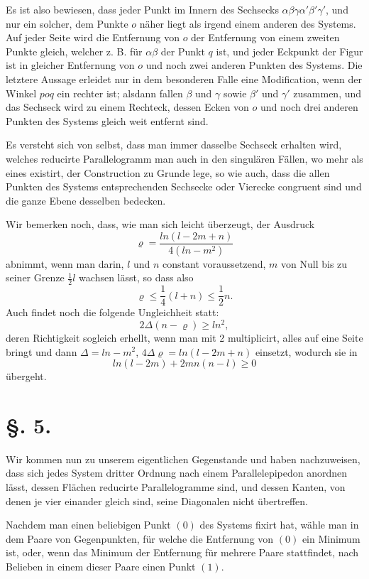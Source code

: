 \documentclass[11pt]{article}
\begin{document}
Es ist also bewiesen, dass jeder Punkt im Innern des Sechsecks $\alpha\beta\gamma\alpha'\beta'\gamma'$, und nur ein solcher, dem Punkte $o$ näher liegt als irgend einem anderen des Systems. Auf jeder Seite wird die Entfernung von $o$ der Entfernung von einem zweiten Punkte gleich, welcher z. B. für $\alpha\beta$ der Punkt $q$ ist, und jeder Eckpunkt der Figur ist in gleicher Entfernung von $o$ und noch zwei anderen Punkten des Systems. Die letztere Aussage erleidet nur in dem besonderen Falle eine Modification, wenn der Winkel $poq$ ein rechter ist; alsdann fallen $\beta$ und $\gamma$ sowie $\beta'$ und $\gamma'$ zusammen, und das Sechseck wird zu einem Rechteck, dessen Ecken von $o$ und noch drei anderen Punkten des Systems gleich weit entfernt sind.

Es versteht sich von selbst, dass man immer dasselbe Sechseck erhalten wird, welches reducirte Parallelogramm man auch in den singulären Fällen, wo mehr als eines existirt, der Construction zu Grunde lege, so wie auch, dass die allen Punkten des Systems entsprechenden Sechsecke oder Vierecke congruent sind und die ganze Ebene desselben bedecken.

Wir bemerken noch, dass, wie man sich leicht überzeugt, der Ausdruck
\[
 \varrho=\frac{ln(l-2m+n)}{4(ln-m^2)}
\]
abnimmt, wenn man darin, $l$ und $n$ constant voraussetzend, $m$ von Null bis zu seiner Grenze $\frac12 l$ wachsen lässt, so dass also
\begin{equation}
 \varrho\le \frac14(l+n)\le \frac12 n.
\end{equation}
Auch findet noch die folgende Ungleichheit statt:
\begin{equation}
 2\Delta(n-\varrho)\ge ln^2,
\end{equation}
deren Richtigkeit sogleich erhellt, wenn man mit 2 multiplicirt, alles auf eine Seite bringt und dann $\Delta=ln-m^2$, $4\Delta\varrho=ln(l-2m+n)$ einsetzt, wodurch sie in
\[
 ln(l-2m)+2mn(n-l)\ge0
\]
übergeht.

\section*{§. 5.}

Wir kommen nun zu unserem eigentlichen Gegenstande und haben nachzuweisen, dass sich jedes System dritter Ordnung nach einem Parallelepipedon anordnen lässt, dessen Flächen reducirte Parallelogramme sind, und dessen Kanten, von denen je vier einander gleich sind, seine Diagonalen nicht übertreffen.

Nachdem man einen beliebigen Punkt $(0)$ des Systems fixirt hat, wähle man in dem Paare von Gegenpunkten, für welche die Entfernung von $(0)$ ein Minimum ist, oder, wenn das Minimum der Entfernung für mehrere Paare stattfindet, nach Belieben in einem dieser Paare einen Punkt $(1)$.
\end{document}
